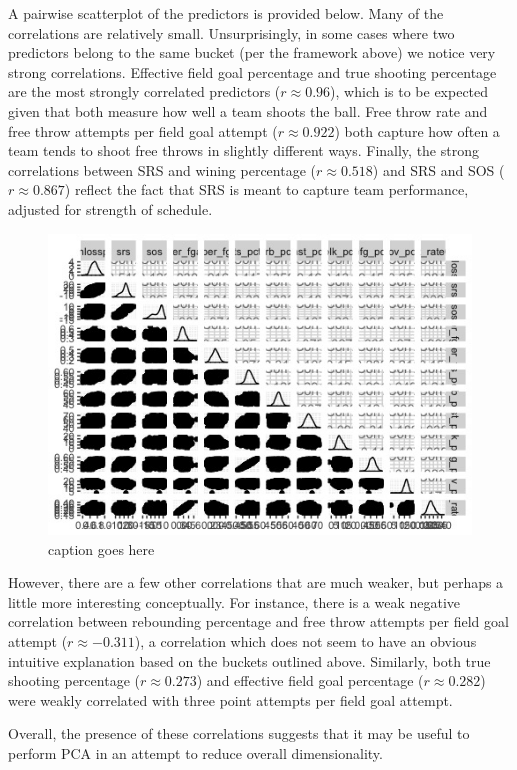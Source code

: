 \documentclass[10pt,a4paper, hidelinks]{article} %
\begin{document}

A pairwise scatterplot of the predictors is provided below. Many of the correlations are relatively small. Unsurprisingly, in some cases where two predictors belong to the same bucket (per the framework above) we notice very strong correlations. Effective field goal percentage and true shooting percentage are the most strongly correlated predictors ($r \approx 0.96$), which is to be expected given that both measure how well a team shoots the ball. Free throw rate and free throw attempts per field goal attempt ($r \approx 0.922$) both capture how often a team tends to shoot free throws in slightly different ways. Finally, the strong correlations between SRS and wining percentage ($r \approx 0.518$) and SRS and SOS ($r \approx 0.867$) reflect the fact that SRS is meant to capture team performance, adjusted for strength of schedule.

\begin{figure}[H]
	\centering
	\includegraphics[width=0.7\linewidth]{../fig/MoneyMaker}
	\caption{caption goes here}
	\label{fig:ggpairs}
\end{figure} 

However, there are a few other correlations that are much weaker, but perhaps a little more interesting conceptually. For instance, there is a weak negative correlation between rebounding percentage and free throw attempts per field goal attempt ($r \approx -0.311$), a correlation which does not seem to have an obvious intuitive explanation based on the buckets outlined above. Similarly, both true shooting percentage ($r \approx 0.273$) and effective field goal percentage ($r \approx 0.282$) were weakly correlated with three point attempts per field goal attempt.

Overall, the presence of these correlations suggests that it may be useful to perform PCA in an attempt to reduce overall dimensionality.
\end{document}
